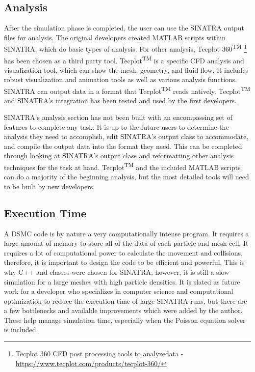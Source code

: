 

\subsection{Analysis}


 After the simulation phase is completed, the user can use the SINATRA output files for analysis. The original developers created MATLAB scripts within SINATRA, which do basic types of analysis. For other analysis, Tecplot 360\textsuperscript{TM} \footnote{Tecplot 360 CFD post processing tools to analyzedata - \url{https://www.tecplot.com/products/tecplot-360/}} has been chosen as a third party tool. Tecplot\textsuperscript{TM} is a specific CFD analysis and visualization tool, which can show the mesh, geometry, and fluid flow. It includes robust visualization and animation tools as well as various analysis functions. SINATRA can output data in a format that Tecplot\textsuperscript{TM} reads natively. Tecplot\textsuperscript{TM} and SINATRA’s integration has been tested and used by the first developers.\par
 \indent SINATRA’s analysis section has not been built with an encompassing set of features to complete any task. It is up to the future users to determine the analysis they need to accomplish, edit SINATRA’s output class to accommodate, and compile the output data into the format they need. This can be completed through looking at SINATRA’s output class and reformatting other analysis techniques for the task at hand. Tecplot\textsuperscript{TM} and the included MATLAB scripts can do a majority of the beginning analysis, but the most detailed tools will need to be built by new developers.

 
\subsection{Execution Time}
A DSMC code is by nature a very computationally intense program. It requires a large amount of memory to store all of the data of each particle and mesh cell. It requires a lot of computational power to calculate the movement and collisions, therefore, it is important to design the code to be efficient and powerful. This is why C++ and classes were chosen for SINATRA; however, it is still a slow simulation for a large meshes with high particle densities. It is slated as future work for a developer who specializes in computer science and computational optimization to reduce the execution time of large SINATRA runs, but there are a few bottlenecks and available improvements which were added by the author. These help manage simulation time, especially when the Poisson equation solver is included. \par

